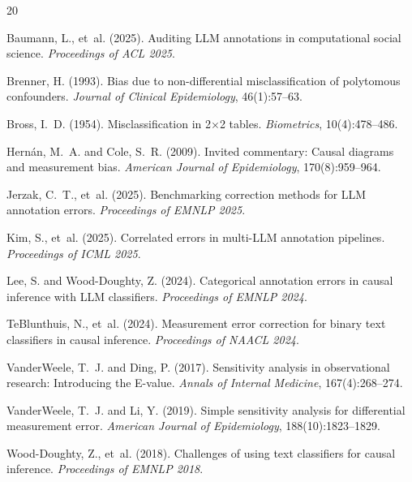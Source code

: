 \documentclass[11pt]{article}
\begin{document}
\begin{thebibliography}{20}

Baumann, L., et~al. (2025).
\newblock Auditing LLM annotations in computational social science.
\newblock \emph{Proceedings of ACL 2025}.

Brenner, H. (1993).
\newblock Bias due to non-differential misclassification of polytomous confounders.
\newblock \emph{Journal of Clinical Epidemiology}, 46(1):57--63.

Bross, I.~D. (1954).
\newblock Misclassification in 2$\times$2 tables.
\newblock \emph{Biometrics}, 10(4):478--486.

Hern{\'a}n, M.~A. and Cole, S.~R. (2009).
\newblock Invited commentary: Causal diagrams and measurement bias.
\newblock \emph{American Journal of Epidemiology}, 170(8):959--964.

Jerzak, C.~T., et~al. (2025).
\newblock Benchmarking correction methods for LLM annotation errors.
\newblock \emph{Proceedings of EMNLP 2025}.

Kim, S., et~al. (2025).
\newblock Correlated errors in multi-LLM annotation pipelines.
\newblock \emph{Proceedings of ICML 2025}.

Lee, S. and Wood-Doughty, Z. (2024).
\newblock Categorical annotation errors in causal inference with LLM classifiers.
\newblock \emph{Proceedings of EMNLP 2024}.

TeBlunthuis, N., et~al. (2024).
\newblock Measurement error correction for binary text classifiers in causal inference.
\newblock \emph{Proceedings of NAACL 2024}.

VanderWeele, T.~J. and Ding, P. (2017).
\newblock Sensitivity analysis in observational research: Introducing the E-value.
\newblock \emph{Annals of Internal Medicine}, 167(4):268--274.

VanderWeele, T.~J. and Li, Y. (2019).
\newblock Simple sensitivity analysis for differential measurement error.
\newblock \emph{American Journal of Epidemiology}, 188(10):1823--1829.

Wood-Doughty, Z., et~al. (2018).
\newblock Challenges of using text classifiers for causal inference.
\newblock \emph{Proceedings of EMNLP 2018}.

\end{thebibliography}
\end{document}
